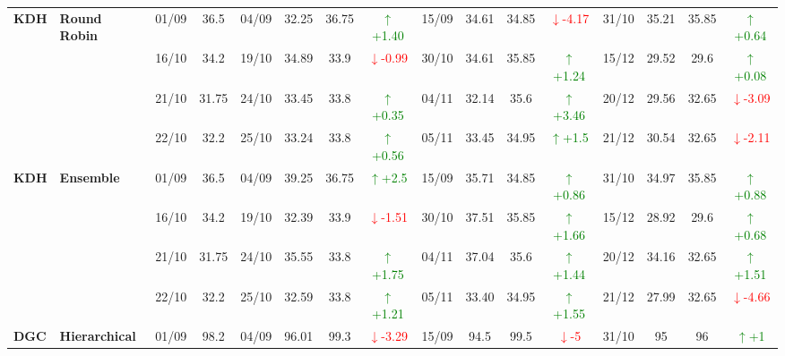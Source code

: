 \documentclass{ieeeaccess}
\begin{document}
{\begin{longtable}{llcc|cccc|cccc|cccc}
\multirow{4}{*}{\textbf{KDH}} 
& \textbf{Round Robin}
& 01/09 & 36.5 & 04/09 & 32.25 & 36.75 & \textcolor{green}{\(\uparrow\)+1.40} & 15/09 & 34.61 & 34.85 & \textcolor{red}{\(\downarrow\)-4.17} & 31/10 & 35.21 & 35.85 & \textcolor{green}{\(\uparrow\)+0.64} \\

&
& 16/10 & 34.2 & 19/10 & 34.89 & 33.9 & \textcolor{red}{\(\downarrow\)-0.99} & 30/10 & 34.61 & 35.85 & \textcolor{green}{\(\uparrow\)+1.24} & 15/12 & 29.52 & 29.6 & \textcolor{green}{\(\uparrow\)+0.08} \\

&
& 21/10 & 31.75 & 24/10 & 33.45 & 33.8 & \textcolor{green}{\(\uparrow\)+0.35} & 04/11 & 32.14 & 35.6 & \textcolor{green}{\(\uparrow\)+3.46} & 20/12 & 29.56 & 32.65 &\textcolor{red}{\(\downarrow\)-3.09}\\

&
& 22/10 & 32.2 & 25/10 & 33.24 & 33.8 & \textcolor{green}{\(\uparrow\)+0.56} & 05/11 & 33.45 & 34.95 & \textcolor{green}{\(\uparrow\)+1.5} & 21/12 & 30.54 & 32.65 & \textcolor{red}{\(\downarrow\)-2.11} \\
\midrule



\multirow{4}{*}{\textbf{KDH}} 
& \textbf{Ensemble}
& 01/09 & 36.5 & 04/09 & 39.25 & 36.75 & \textcolor{green}{\(\uparrow\)+2.5} & 15/09 & 35.71 & 34.85 & \textcolor{green}{\(\uparrow\)+0.86} & 31/10 & 34.97 & 35.85 & \textcolor{green}{\(\uparrow\)+0.88} \\

&
& 16/10 & 34.2 & 19/10 & 32.39 & 33.9 & \textcolor{red}{\(\downarrow\)-1.51} & 30/10 & 37.51 & 35.85 & \textcolor{green}{\(\uparrow\)+1.66} & 15/12 & 28.92 & 29.6 & \textcolor{green}{\(\uparrow\)+0.68} \\

&
& 21/10 & 31.75 & 24/10 & 35.55 & 33.8 & \textcolor{green}{\(\uparrow\)+1.75} & 04/11 & 37.04 & 35.6 & \textcolor{green}{\(\uparrow\)+1.44} & 20/12 & 34.16 & 32.65 &\textcolor{green}{\(\uparrow\)+1.51}\\

&
& 22/10 & 32.2 & 25/10 & 32.59 & 33.8 & \textcolor{green}{\(\uparrow\)+1.21} & 05/11 & 33.40 & 34.95 & \textcolor{green}{\(\uparrow\)+1.55} & 21/12 & 27.99 & 32.65 & \textcolor{red}{\(\downarrow\)-4.66} \\
\midrule




\multirow{4}{*}{\textbf{DGC}} 
& \textbf{Hierarchical}
& 01/09 & 98.2 & 04/09 & 96.01 & 99.3 & \textcolor{red}{\(\downarrow\)-3.29} & 15/09 & 94.5 & 99.5 & \textcolor{red}{\(\downarrow\)-5} & 31/10 & 95 & 96 & \textcolor{green}{\(\uparrow\)+1} \\


\end{longtable}}
\end{document}
